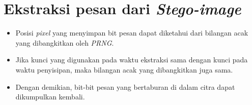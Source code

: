 \documentclass{article}
\begin{document}

\section*{Ekstraksi pesan dari \textit{Stego-image}}

\begin{itemize}
    \item Posisi \textit{pixel} yang menyimpan bit pesan dapat diketahui dari bilangan acak yang dibangkitkan oleh \textit{PRNG}.
    \item Jika kunci yang digunakan pada waktu ekstraksi sama dengan kunci pada waktu penyisipan, maka bilangan acak yang dibangkitkan juga sama.
    \item Dengan demikian, bit-bit pesan yang bertaburan di dalam citra dapat dikumpulkan kembali.
\end{itemize}
\end{document}
